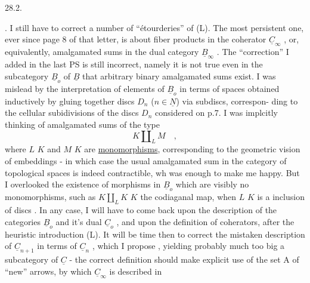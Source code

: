 
28.2.

. I still have to correct a number of ``étourderies'' of (L). The
most persistent one, ever since page 8 of that letter, is about fiber
products in the coherator $\underline{C}_\infty$ , or, equivalently, amalgamated sums in
the dual category $\underline{B}_\infty$ . The ``correction'' I added in the last PS   is
still incorrect, namely it is not true  even in the subcategory
$\underline{B}_o$ of $\underline{B}$ that arbitrary binary amalgamated sums exist. I was mislead
by the interpretation of elements of $\underline{B}_o$ in terms of  spaces\hand{,} obtained
inductively by gluing together discs $D_n$ ($n \in \underline{N}$) via subdiscs, correspon-%
ding to the cellular subidivisions of the discs $D_n$ considered on p.7.
I was implcitly thinking of amalgamated sums of the type
\[ K \amalg_L M \quad , \]
where $L$ \hand{$\to$} $K$ and $M$ \hand{$\to$}$K$ are \uline{monomorphisms}, corresponding to the geometric
vision of embeddings - in which case the usual amalgamated sum in the
category of topological spaces is indeed contractible, wh was enough
to make me happy. But I overlooked the existence of morphisms in $\underline{B}_o$
which are visibly no monomorphisms, such as $K \amalg_L K$ \hand{$\to$} $K$ the codiaganal
map, when $L$ \hand{$\to$}$K$ is a  inclusion of discs . In any case, I will have
to come back upon the description of the categories $\underline{B}_o$ and it's dual $\underline{C}_o$ ,
and upon the definition of coherators, after the heuristic introduction
(L). It will be time then  to correct the mistaken description of $\underline{C}_{n+1}$
in terms of $\underline{C}_n$ , which I propose  , yielding probably much too
big a subcategory of $\underline{C}$\hand{$_\infty$} - the correct definition should make explicit
use of the  set A of  ``new'' arrows, by which $\underline{C}_\infty$ is described in
